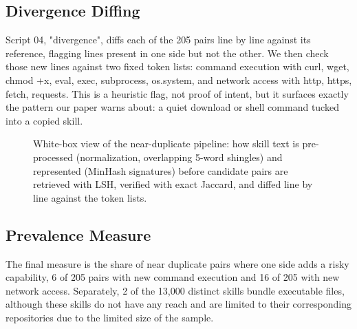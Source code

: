 \documentclass[sigconf,review]{acmart}
\begin{document}
\subsection{Divergence Diffing}
Script 04, "divergence", diffs each of the 205 pairs line by line against its reference, flagging lines present in one side but not the other. We then check those new lines against two fixed token lists: command execution with curl, wget, chmod +x, eval, exec, subprocess, os.system, and network 
access with http, https, fetch, requests. This is a heuristic flag, not proof of intent, but it surfaces exactly the pattern our paper warns about: a quiet download or shell command tucked into a copied skill.

\begin{figure}[t]
\centering
{}
\caption{White-box view of the near-duplicate pipeline: how skill text is pre-processed (normalization, overlapping 5-word shingles) and represented (MinHash signatures) before candidate pairs are retrieved with LSH, verified with exact Jaccard, and diffed line by line against the token lists.}
\label{fig:whitebox}
\end{figure}

\subsection{Prevalence Measure}
The final measure is the share of near duplicate pairs where one side adds a risky capability, 6 of 205 pairs with new command execution and 16 of 205 with new network access. Separately, 2 of the 13,000 distinct skills bundle executable files, although these skills do not have any reach and are limited to their corresponding repositories due to the limited size of the sample.
\end{document}
